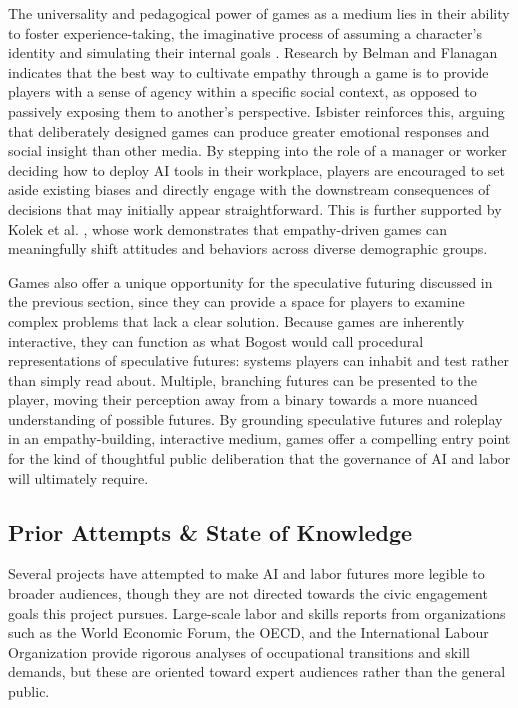\documentclass[sigconf,authordraft]{acmart}
\begin{document}
The universality and pedagogical power of games as a medium lies in their ability to foster experience-taking, the imaginative process of assuming a character's identity and simulating their internal goals \cite{kaufman2012experience}. Research by Belman and Flanagan \cite{belman2010empathy} indicates that the best way to cultivate empathy through a game is to provide players with a sense of agency within a specific social context, as opposed to passively exposing them to another's perspective. Isbister \cite{isbister2016games} reinforces this, arguing that deliberately designed games can produce greater emotional responses and social insight than other media. By stepping into the role of a manager or worker deciding how to deploy AI tools in their workplace, players are encouraged to set aside existing biases and directly engage with the downstream consequences of decisions that may initially appear straightforward. This is further supported by Kolek et al. \cite{kolek2024video}, whose work demonstrates that empathy-driven games can meaningfully shift attitudes and behaviors across diverse demographic groups.

Games also offer a unique opportunity for the speculative futuring discussed in the previous section, since they can provide a space for players to examine complex problems that lack a clear solution. Because games are inherently interactive, they can function as what Bogost \cite{bogost2007persuasive} would call procedural representations of speculative futures: systems players can inhabit and test rather than simply read about. Multiple, branching futures can be presented to the player, moving their perception away from a binary towards a more nuanced understanding of possible futures. By grounding speculative futures and roleplay in an empathy-building, interactive medium, games offer a compelling entry point for the kind of thoughtful public deliberation that the governance of AI and labor will ultimately require.


\subsection{Prior Attempts \& State of Knowledge}

Several projects have attempted to make AI and labor futures more legible to broader audiences, though they are not directed towards the civic engagement goals this project pursues. Large-scale labor and skills reports from organizations such as the World Economic Forum, the OECD, and the International Labour Organization provide rigorous analyses of occupational transitions and skill demands, but these are oriented toward expert audiences rather than the general public.
\end{document}
